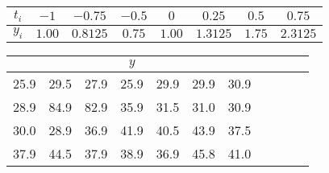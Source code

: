 \begin{table}[ht]
    \centering
    \begin{tabular}{c|ccccccc}
        \hline
        $t_i$ & $- 1$ & $- 0.75$ & $- 0.5$ & $0$ & $0.25$ & $0.5$ & $0.75$ \\
        \hline
        $y_i$ & $1.00$ & $0.8125$ & $0.75$ & $1.00$ & $1.3125$ & $1.75$ & $2.3125$ \\
        \hline
    \end{tabular}
\end{table}

\begin{table}[ht]
    \centering
    \begin{tabular}{ccccccccccc}
        \hline
        \multicolumn{7}{c}{$y$} \\
        \hline
        25.9 & 29.5 & 27.9 & 25.9 & 29.9 & 29.9 & 30.9 \\
        28.9 & 84.9 & 82.9 & 35.9 & 31.5 & 31.0 & 30.9 \\
        30.0 & 28.9 & 36.9 & 41.9 & 40.5 & 43.9 & 37.5 \\
        37.9 & 44.5 & 37.9 & 38.9 & 36.9 & 45.8 & 41.0 \\
        \hline
    \end{tabular}
\end{table}

